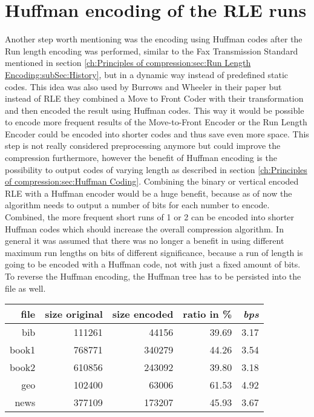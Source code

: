 {{\section{Huffman encoding of the RLE runs}
\label{ch:Conceptual Design:sec:Postprocessing}
\par{
Another step worth mentioning was the encoding using Huffman codes after the Run length encoding was performed, similar to the Fax Transmission Standard mentioned in section \ref{ch:Principles of compression:sec:Run Length Encoding:subSec:History}, but in a dynamic way instead of predefined static codes. This idea was also used by Burrows and Wheeler in their paper \cite{Burrows94} but instead of RLE they combined a Move to Front Coder with their transformation and then encoded the result using Huffman codes. This way it would be possible to encode more frequent results of the Move-to-Front Encoder or the Run Length Encoder could be encoded into shorter codes and thus save even more space. This step is not really considered preprocessing anymore but could improve the compression furthermore, however the benefit of Huffman encoding is the possibility to output codes of varying length as described in section \ref{ch:Principles of compression:sec:Huffman Coding}. Combining the binary or vertical encoded RLE with a Huffman encoder would be a huge benefit, because as of now the algorithm needs to output a number of bits for each number to encode. Combined, the more frequent short runs of 1 or 2 can be encoded into shorter Huffman codes which should increase the overall compression algorithm. In general it was assumed that there was no longer a benefit in using different maximum run lengths on bits of different significance, because a run of length is going to be encoded with a Huffman code, not with just a fixed amount of bits. To reverse the Huffman encoding, the Huffman tree has to be persisted into the file as well.
	\begin{table}[h]
		\centering
		\begin{tabular}{r|r|r|r|r}	
			file & size original & size encoded & ratio in \% & \textit{bps}\\
			\hline
bib & 111261 & 44156 & 39.69 & 3.17 \\
book1 & 768771 & 340279 & 44.26 & 3.54 \\
book2 & 610856 & 243092 & 39.80 & 3.18 \\
geo & 102400 & 63006 & 61.53 & 4.92 \\
news & 377109 & 173207 & 45.93 & 3.67 \\

\end{tabular}
\end{table}}}}
